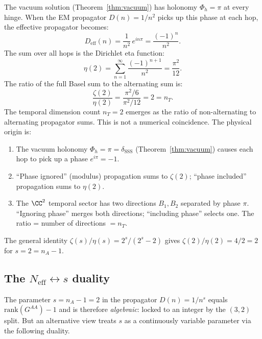 \begin{remark}
\label{rem:zeta_eta}
The vacuum solution (Theorem~\ref{thm:vacuum}) has holonomy $\Phi_h = \pi$ at every hinge.  When the EM propagator $D(n) = 1/n^2$ picks up this phase at each hop, the effective propagator becomes:
\begin{equation}
D_\text{eff}(n) = \frac{1}{n^2}\,e^{in\pi} = \frac{(-1)^n}{n^2}.
\end{equation}
The sum over all hops is the Dirichlet eta function:
\begin{equation}
\eta(2) = \sum_{n=1}^{\infty}\frac{(-1)^{n+1}}{n^2} = \frac{\pi^2}{12}.
\end{equation}
The ratio of the full Basel sum to the alternating sum is:
\begin{equation}
\boxed{\frac{\zeta(2)}{\eta(2)} = \frac{\pi^2/6}{\pi^2/12} = 2 = n_T.}
\end{equation}
The temporal dimension count $n_T = 2$ emerges as the ratio of non-alternating to alternating propagator sums.  This is not a numerical coincidence.  The physical origin is:

\begin{enumerate}
\item The vacuum holonomy $\Phi_h = \pi = \delta_{\mathrm{SSS}}$ (Theorem~\ref{thm:vacuum}) causes each hop to pick up a phase $e^{i\pi} = -1$.
\item ``Phase ignored'' (modulus) propagation sums to $\zeta(2)$; ``phase included'' propagation sums to $\eta(2)$.
\item The $\CC^2$ temporal sector has two directions $B_1, B_2$ separated by phase $\pi$.  ``Ignoring phase'' merges both directions; ``including phase'' selects one.  The ratio = number of directions $= n_T$.
\end{enumerate}

The general identity $\zeta(s)/\eta(s) = 2^s/(2^s - 2)$ gives $\zeta(2)/\eta(2) = 4/2 = 2$ for $s = 2 = n_A - 1$.
\end{remark}

\subsection{The $N_\text{eff} \leftrightarrow s$ duality}
\label{sec:Neff_s_duality}

The parameter $s = n_A - 1 = 2$ in the propagator $D(n) = 1/n^s$ equals $\mathrm{rank}(G^{AA}) - 1$ and is therefore \emph{algebraic}: locked to an integer by the $(3,2)$ split.  But an alternative view treats $s$ as a continuously variable parameter via the following duality.

